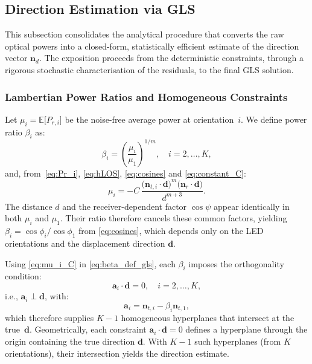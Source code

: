 \documentclass[journal]{IEEEtran}
\newcommand{\added}[1]{{\color{blue}#1}}
\begin{document}
\subsection{Direction Estimation via GLS}
\label{subsec:gls_direction}

This subsection consolidates the analytical procedure that converts the raw optical powers into a closed-form, statistically efficient estimate of the direction vector $\mathbf{n}_d$. The exposition proceeds from the deterministic constraints, through a rigorous stochastic characterisation of the residuals, to the final GLS solution. 

\subsubsection{Lambertian Power Ratios and Homogeneous Constraints}
Let $\mu_i=\mathbb E\!\bigl[P_{r,i}\bigr]$ be the noise-free average power at orientation~$i$. We define power ratio $\beta_i$ as:
\begin{equation}
  \beta_i=\left(\frac{\mu_i}{\mu_1}\right)^{1/m}, \quad i=2,\ldots,K,
  \label{eq:beta_def_gls}
\end{equation}
and, from~\eqref{eq:Pr_i}, \eqref{eq:hLOS}, \eqref{eq:cosines} and \eqref{eq:constant_C}:
\begin{equation}
\mu_i=-C\,\frac{\bigl(\mathbf{n}_{t,i}\cdot\mathbf{d}\bigr)^{m}
\bigl(\mathbf{n}_r\cdot\mathbf{d}\bigr)}{d^{m+3}}.
\label{eq:mu_i_C}
\end{equation}
\added{The distance $d$ and the receiver-dependent factor $\cos\psi$ appear identically in both $\mu_i$ and $\mu_1$. Their ratio therefore cancels these common factors, yielding $\beta_i = \cos\phi_i / \cos\phi_1$ from \eqref{eq:cosines}, which depends only on the LED orientations and the displacement direction $\mathbf{d}$.}

Using \eqref{eq:mu_i_C} in \eqref{eq:beta_def_gls}, each $\beta_i$ imposes the orthogonality condition:
\begin{equation}
  \mathbf a_i\cdot
  \mathbf d=0,
  \quad
  i=2,\ldots,K,
  \label{eq:homog_gls}
\end{equation}
i.e., $\mathbf a_i \perp \mathbf d$, with:
\begin{equation}
\mathbf a_i\!=\!\mathbf n_{t,i}-\beta_i\mathbf n_{t,1}, 
\label{eq:definition_a_i}
\end{equation}
which therefore supplies $K-1$ homogeneous hyperplanes that intersect at the true~$\mathbf d$.
\added{Geometrically, each constraint $\mathbf{a}_i\cdot\mathbf{d}=0$ defines a hyperplane through the origin containing the true direction $\mathbf{d}$. With $K-1$ such hyperplanes (from $K$ orientations), their intersection yields the direction estimate.}
\end{document}
